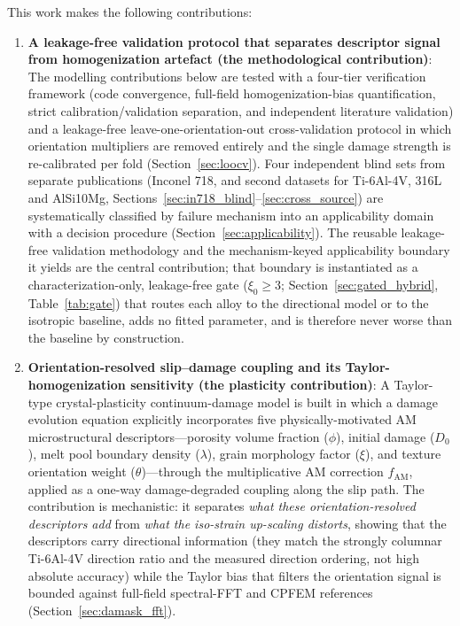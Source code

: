 This work makes the following contributions:

\begin{enumerate}\def\labelenumi{(\arabic{enumi})}
    \item \textbf{A leakage-free validation protocol that separates descriptor signal from homogenization artefact (the methodological contribution)}: The modelling contributions below are tested with a four-tier verification framework (code convergence, full-field homogenization-bias quantification, strict calibration/validation separation, and independent literature validation) and a leakage-free leave-one-orientation-out cross-validation protocol in which orientation multipliers are removed entirely and the single damage strength is re-calibrated per fold (Section~\ref{sec:loocv}). Four independent blind sets from separate publications (Inconel 718, and second datasets for Ti-6Al-4V, 316L and AlSi10Mg, Sections~\ref{sec:in718_blind}--\ref{sec:cross_source}) are systematically classified by failure mechanism into an applicability domain with a decision procedure (Section~\ref{sec:applicability}). The reusable leakage-free validation methodology and the mechanism-keyed applicability boundary it yields are the central contribution; that boundary is instantiated as a characterization-only, leakage-free gate ($\xi_0\ge3$; Section~\ref{sec:gated_hybrid}, Table~\ref{tab:gate}) that routes each alloy to the directional model or to the isotropic baseline, adds no fitted parameter, and is therefore never worse than the baseline by construction.
    
    \item \textbf{Orientation-resolved slip--damage coupling and its Taylor-homogenization sensitivity (the plasticity contribution)}: A Taylor-type crystal-plasticity continuum-damage model is built in which a damage evolution equation explicitly incorporates five physically-motivated AM microstructural descriptors---porosity volume fraction ($\phi$), initial damage ($D_0$), melt pool boundary density ($\lambda$), grain morphology factor ($\xi$), and texture orientation weight ($\theta$)---through the multiplicative AM correction $f_{\text{AM}}$, applied as a one-way damage-degraded coupling along the slip path. The contribution is mechanistic: it separates \emph{what these orientation-resolved descriptors add} from \emph{what the iso-strain up-scaling distorts}, showing that the descriptors carry directional information (they match the strongly columnar Ti-6Al-4V direction ratio and the measured direction ordering, not high absolute accuracy) while the Taylor bias that filters the orientation signal is bounded against full-field spectral-FFT and CPFEM references (Section~\ref{sec:damask_fft}).
    

\end{enumerate}
